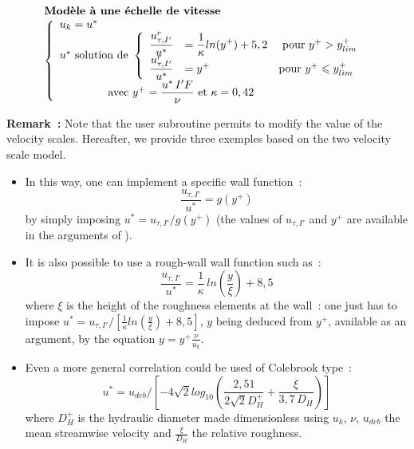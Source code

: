 \begin{equation}
\begin{array}{l}
\text{\bf Mod\`ele \`a une \'echelle de vitesse}\\
\left\{\begin{array}{l}
u_k = u^*\\
u^* \text{ solution de } \left\{\begin{array}{lll}
\displaystyle\frac{u^r_{\tau,I'}}{u^*} &=
\displaystyle\frac{1}{\kappa}ln(y^+)+5,2 &\text { pour }y^+>y^+_{lim}\\
\displaystyle\frac{u^r_{\tau,I'}}{u^*} &= y^+                         &\text
{pour } y^+\leqslant y^+_{lim}
\end{array}\right.\\
\qquad\qquad\text{   avec   } y^+=\displaystyle\frac{u^*\,I'F}{\nu}
                                                      \text{  et }\kappa=0,42
\end{array}\right.
\end{array}
\end{equation}


{\bf Remark~:} Note that the user subroutine  permits to modify 
the value of the velocity scales. Hereafter, we provide three exemples 
based on the two velocity scale model.
\begin{itemize}
\item In this way, one can implement a specific wall function~:
$$\displaystyle\frac{u_{\tau,I'}}{u^*}=g(y^+)$$
by simply imposing
$\displaystyle{u^*}=u_{\tau,I'}/g(y^+)$ (the values of $u_{\tau,I'}$ and $y^+$
are available in the arguments of ).
\item It is also possible to use a rough-wall wall function such as~:
$$\displaystyle\frac{u_{\tau,I'}}{u^*}=\displaystyle\frac{1}{\kappa}\,ln(\frac{y}{\xi})+8,5$$
where $\xi$ is the height of the roughness elements at the wall~: one just has to impose 
$\displaystyle u^*=u_{\tau,I'}/\left[\frac{1}{\kappa}ln(\frac{y}{\xi})+8,5\right]$,
 $y$ being deduced from $y^+$, available as an argument, by the equation 
$\displaystyle y=y^+\frac{\nu}{u_k}$.
\item Even a more general correlation could be used of  
Colebrook type~:
$$u^*=u_{deb}/\left[-4\sqrt{2}log_{10}\left(\displaystyle\frac{2,51}{2\sqrt{2}D_H^+}+\frac{\xi}{3,7\,D_H}\right)\right]$$
where $D_H^+$ is the hydraulic diameter made dimensionless using $u_k$, $\nu$,
$u_{deb}$ the mean streamwise velocity 
and $\displaystyle\frac{\xi}{D_H}$ the relative roughness.
\end{itemize}



